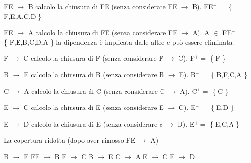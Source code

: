 \documentclass[12pt,a4paper]{article}
\begin{document}
    \noindent %
    FE $\rightarrow$ B calcolo la chiusura di FE (senza considerare FE $\rightarrow$ B). \newline
    FE$^+ =$ \{ F,E,A,C,D \} \newline

    \noindent %
    FE $\rightarrow$ A calcolo la chiusura di FE (senza considerare FE $\rightarrow$ A). \newline
    A $\in$ FE$^+ =$ \{ F,E,B,C,D,A \} la dipendenza è implicata dalle altre e può essere eliminata. \newline 

    \noindent %
    F $\rightarrow$ C calcolo la chiusura di F (senza considerare F $\rightarrow$ C). \newline
    F$^+ =$ \{ F \} \newline

    \noindent %
    B $\rightarrow$ E calcolo la chiusura di B (senza considerare B $\rightarrow$ E). \newline
    B$^+ =$ \{ B,F,C,A \} \newline

    \noindent %
    C $\rightarrow$ A calcolo la chiusura di C (senza considerare C $\rightarrow$ A). \newline
    C$^+ =$ \{ C \} \newline

    \noindent %
    E $\rightarrow$ C calcolo la chiusura di E (senza considerare E $\rightarrow$ C). \newline
    E$^+ =$ \{ E,D \} \newline

    \noindent %
    E $\rightarrow$ D calcolo la chiusura di E (senza considerare e $\rightarrow$ D). \newline
    E$^+ =$ \{ E,C,A \} \newline

    \noindent
    La copertura ridotta (dopo aver rimosso FE $\rightarrow$ A) \newline

    \noindent
    B $\rightarrow$ F \newline
    FE $\rightarrow$ B \newline
    F $\rightarrow$ C \newline
    B $\rightarrow$ E \newline
    C $\rightarrow$ A \newline
    E $\rightarrow$ C \newline
    E $\rightarrow$ D \newline
\end{document}
